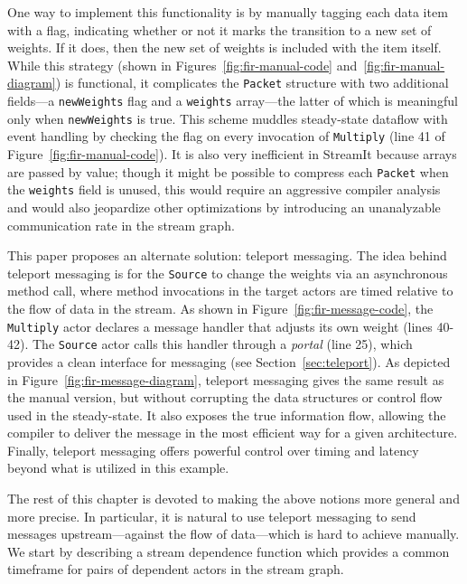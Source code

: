 One way to implement this functionality is by manually tagging each
data item with a flag, indicating whether or not it marks the
transition to a new set of weights.  If it does, then the new set of
weights is included with the item itself.  While this strategy (shown
in Figures~\ref{fig:fir-manual-code} and~\ref{fig:fir-manual-diagram})
is functional, it complicates the {\tt Packet} structure with two
additional fields---a {\tt newWeights} flag and a {\tt weights}
array---the latter of which is meaningful only when {\tt newWeights}
is true.  This scheme muddles steady-state dataflow with event
handling by checking the flag on every invocation of {\tt Multiply}
(line 41 of Figure~\ref{fig:fir-manual-code}).  It is also very
inefficient in StreamIt because arrays are passed by value; though it
might be possible to compress each {\tt Packet} when the {\tt weights}
field is unused, this would require an aggressive compiler analysis
and would also jeopardize other optimizations by introducing an
unanalyzable communication rate in the stream graph.

This paper proposes an alternate solution: teleport messaging.  The
idea behind teleport messaging is for the {\tt Source} to change the
weights via an asynchronous method call, where method invocations in
the target actors are timed relative to the flow of data in the
stream.  As shown in Figure~\ref{fig:fir-message-code}, the {\tt
Multiply} actor declares a message handler that adjusts its own weight
(lines 40-42).  The {\tt Source} actor calls this handler through a
{\it portal} (line 25), which provides a clean interface for messaging
(see Section~\ref{sec:teleport}).  As depicted in
Figure~\ref{fig:fir-message-diagram}, teleport messaging gives the
same result as the manual version, but without corrupting the data
structures or control flow used in the steady-state.  It also exposes
the true information flow, allowing the compiler to deliver the
message in the most efficient way for a given architecture.  Finally,
teleport messaging offers powerful control over timing and latency
beyond what is utilized in this example.

The rest of this chapter is devoted to making the above notions more
general and more precise.  In particular, it is natural to use
teleport messaging to send messages upstream---against the flow of
data---which is hard to achieve manually.  We start by describing a
stream dependence function which provides a common timeframe for pairs
of dependent actors in the stream graph.

